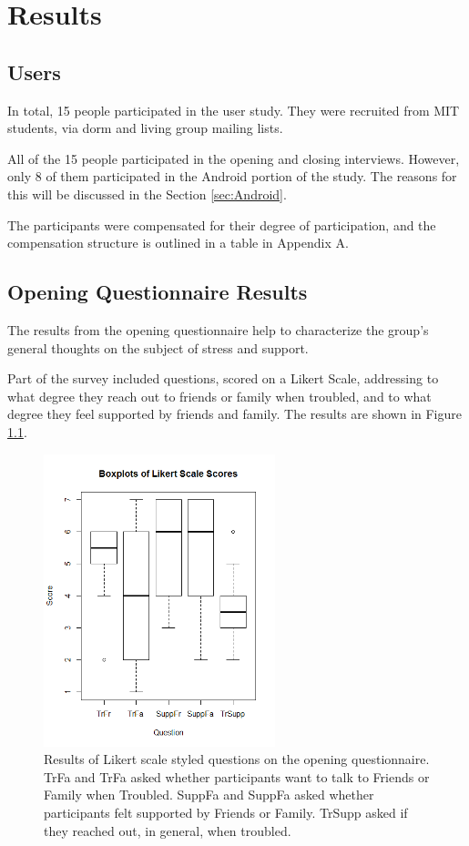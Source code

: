 \chapter{Results}
\section{Users}
  In total, 15 people participated in the user study.
  They were recruited from MIT students,
  via dorm and living group mailing lists.

  All of the 15 people participated in the opening and closing interviews.
  However, only 8 of them participated in the Android portion of the study.
  The reasons for this will be discussed in the Section \ref{sec:Android}.

  The participants were compensated for their degree of participation,
  and the compensation structure is outlined in a table in Appendix A.

\section{Opening Questionnaire Results}
  The results from the opening questionnaire help to characterize the group's
  general thoughts on the subject of stress and support.
  
  Part of the survey included questions, scored on a Likert Scale,
  addressing to what degree they reach out to friends or family when troubled,
  and to what degree they feel supported by friends and family.
  The results are shown in Figure \ref{fig:likert}.

    \begin{figure}
    \centering
    \includegraphics[width=0.6\textwidth]{likert.png}
    \caption{
      Results of Likert scale styled questions on the opening questionnaire.
      TrFa and TrFa asked whether participants want to talk to
      Friends or Family when Troubled.
      SuppFa and SuppFa asked whether participants felt supported by
      Friends or Family.
      TrSupp asked if they reached out, in general, when troubled.
    }
    \label{fig:likert}
    \end{figure}

